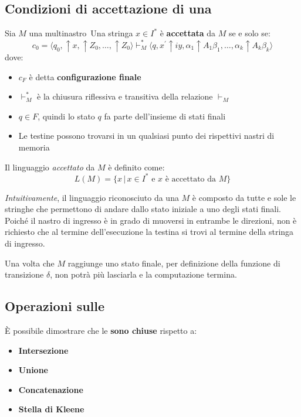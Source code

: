 \documentclass[italian, 10pt]{article}
\begin{document}
\subsection{Condizioni di accettazione di una \TM}

Sia \(M\) una \TM multinastro\
Una stringa \(x \in I^\ast\) è \textbf{accettata} da \(M\) se e solo se:
\[ c_0 = \langle q_0, \uparrow x, \uparrow Z_0, \ldots, \uparrow Z_0 \rangle \vdash^\ast_M \langle q, x^\prime \uparrow iy, \alpha_1 \uparrow A_1 \beta_1, \ldots, \alpha_k \uparrow A_k \beta_k \rangle \]
dove:
\begin{itemize}
  \item \(c_F\) è detta \textbf{configurazione finale}
  \item \(\vdash^\ast_M\) è la chiusura riflessiva e transitiva della relazione \(\vdash_M\)
  \item \(q \in F\), quindi lo stato \(q\) fa parte dell'insieme di stati finali
  \item Le testine possono trovarsi in un qualsiasi punto dei rispettivi nastri di memoria
\end{itemize}

\bigskip
Il linguaggio \textit{accettato} da \(M\) è definito come:
\[ L(M) = \{x \, | \, x \in I^\ast \text{ e } x \text{ è accettato da } M\} \]

\textit{Intuitivamente}, il linguaggio riconosciuto da una \TM \(M\) è composto da tutte e sole le stringhe che permettono di andare dallo stato iniziale a uno degli stati finali.
Poiché il nastro di ingresso è in grado di muoversi in entrambe le direzioni, non è richiesto che al termine dell'esecuzione la testina si trovi al termine della stringa di ingresso.

Una volta che \(M\) raggiunge uno stato finale, per definizione della funzione di transizione \(\delta\), non potrà più lasciarla e la computazione termina.

\subsection{Operazioni sulle \TM}

È possibile dimostrare che le \TM \textbf{sono chiuse} rispetto a:
\begin{itemize}
  \item \textbf{Intersezione}
  \item \textbf{Unione}
  \item \textbf{Concatenazione}
  \item \textbf{Stella di Kleene}
\end{itemize}
\end{document}
